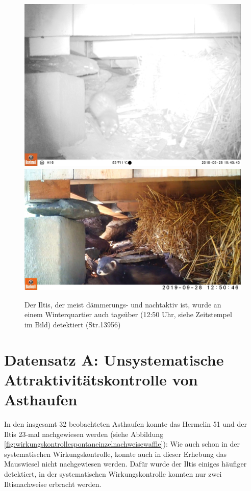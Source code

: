 \documentclass[
  oneside]{scrbook}
\begin{document}
\begin{figure}
\includegraphics[width=1\linewidth]{images/str13956/09280317} \includegraphics[width=1\linewidth]{images/str13956/capture} \caption{Der Iltis, der meist dämmerungs- und nachtaktiv ist, wurde an einem Winterquartier auch tagsüber (12:50 Uhr, siehe Zeitstempel im Bild) detektiert (Str.13956)}\label{fig:unnamed-chunk-7}
\end{figure}

\hypertarget{datensatz-a-unsystematische-attraktivituxe4tskontrolle-von-asthaufen-1}{%
\section{Datensatz A: Unsystematische Attraktivitätskontrolle von Asthaufen}\label{datensatz-a-unsystematische-attraktivituxe4tskontrolle-von-asthaufen-1}}

In den insgesamt 32 beobachteten Asthaufen konnte das Hermelin 51 und der Iltis 23-mal nachgewiesen werden (siehe Abbildung \ref{fig:wirkungskontrollespontaneinzelnachweisewaffle}): Wie auch schon in der systematischen Wirkungskontrolle, konnte auch in dieser Erhebung das Mauswiesel nicht nachgewiesen werden. Dafür wurde der Iltis einiges häufiger detektiert, in der systematischen Wirkungskontrolle konnten nur zwei Iltisnachweise erbracht werden.
\end{document}

